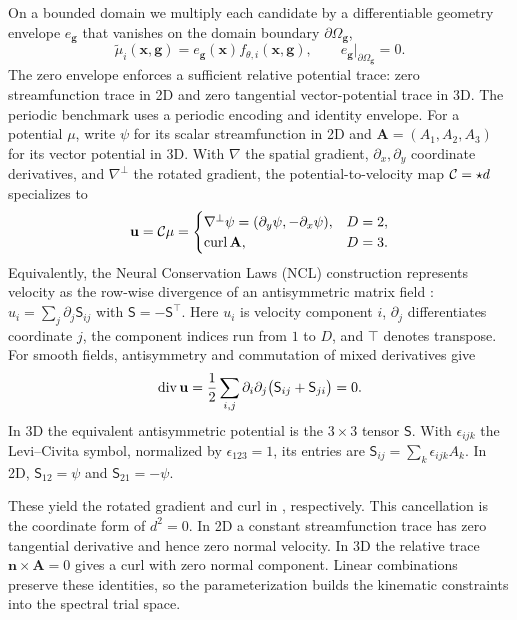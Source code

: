 On a bounded domain we multiply each candidate by a differentiable geometry envelope $e_{\mathbf g}$ that vanishes on the domain boundary $\partial\Omega_{\mathbf g}$,
\begin{equation}
\widetilde\mu_i(\mathbf x,\mathbf g)=e_{\mathbf g}(\mathbf x)f_{\theta,i}(\mathbf x,\mathbf g),
\qquad e_{\mathbf g}|_{\partial\Omega_{\mathbf g}}=0.
\label{eq:envelope}
\end{equation}
The zero envelope enforces a sufficient relative potential trace: zero streamfunction trace in 2D and zero tangential vector-potential trace in 3D. The periodic benchmark uses a periodic encoding and identity envelope. For a potential $\mu$, write $\psi$ for its scalar streamfunction in 2D and $\mathbf A=(A_1,A_2,A_3)$ for its vector potential in 3D. With $\nabla$ the spatial gradient, $\partial_x,\partial_y$ coordinate derivatives, and $\nabla^\perp$ the rotated gradient, the potential-to-velocity map $\mathcal C=\star d$ specializes to
\begin{equation}
\mathbf u=\mathcal C\mu=
\begin{cases}
\nabla^\perp\psi=(\partial_y\psi,-\partial_x\psi),&D=2,\\
\operatorname{curl}\mathbf A,&D=3.
\end{cases}
\label{eq:lift}
\end{equation}
Equivalently, the Neural Conservation Laws (NCL) construction represents velocity as the row-wise divergence of an antisymmetric matrix field \citep{richterpowell2022neural}: $u_i=\sum_j\partial_j\mathsf S_{ij}$ with $\mathsf S=-\mathsf S^{\top}$. Here $u_i$ is velocity component $i$, $\partial_j$ differentiates coordinate $j$, the component indices run from $1$ to $D$, and $\top$ denotes transpose. For smooth fields, antisymmetry and commutation of mixed derivatives give
\begin{equation}
\operatorname{div}\mathbf u=\frac12\sum_{i,j}\partial_i\partial_j
\bigl(\mathsf S_{ij}+\mathsf S_{ji}\bigr)=0.
\label{eq:ncl-antisymmetric}
\end{equation}
\begingroup
In 3D the equivalent antisymmetric potential is the $3\times3$ tensor $\mathsf S$. With $\epsilon_{ijk}$ the Levi--Civita symbol, normalized by $\epsilon_{123}=1$, its entries are $\mathsf S_{ij}=\sum_k\epsilon_{ijk}A_k$. In 2D, $\mathsf S_{12}=\psi$ and $\mathsf S_{21}=-\psi$.
\par\endgroup
These yield the rotated gradient and curl in , respectively. This cancellation is the coordinate form of $d^2=0$. In 2D a constant streamfunction trace has zero tangential derivative and hence zero normal velocity. In 3D the relative trace $\mathbf n\times\mathbf A=0$ gives a curl with zero normal component. Linear combinations preserve these identities, so the parameterization builds the kinematic constraints into the spectral trial space.

